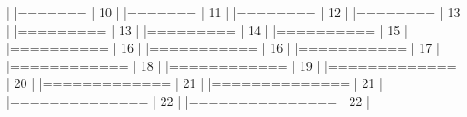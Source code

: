 \documentclass[10pt]{article}
\newenvironment{CodeChunk}{}{}
\begin{document}
\begin{CodeChunk}
\begin{CodeChunk}
\begin{CodeOutput}
  |                                                                       
  |=======                                                          |  10%
  |                                                                       
  |=======                                                          |  11%
  |                                                                       
  |========                                                         |  12%
  |                                                                       
  |========                                                         |  13%
  |                                                                       
  |=========                                                        |  13%
  |                                                                       
  |=========                                                        |  14%
  |                                                                       
  |==========                                                       |  15%
  |                                                                       
  |==========                                                       |  16%
  |                                                                       
  |===========                                                      |  16%
  |                                                                       
  |===========                                                      |  17%
  |                                                                       
  |============                                                     |  18%
  |                                                                       
  |============                                                     |  19%
  |                                                                       
  |=============                                                    |  20%
  |                                                                       
  |=============                                                    |  21%
  |                                                                       
  |==============                                                   |  21%
  |                                                                       
  |==============                                                   |  22%
  |                                                                       
  |===============                                                  |  22%
  |                                                                       

\end{CodeOutput}
\end{CodeChunk}
\end{CodeChunk}
\end{document}
